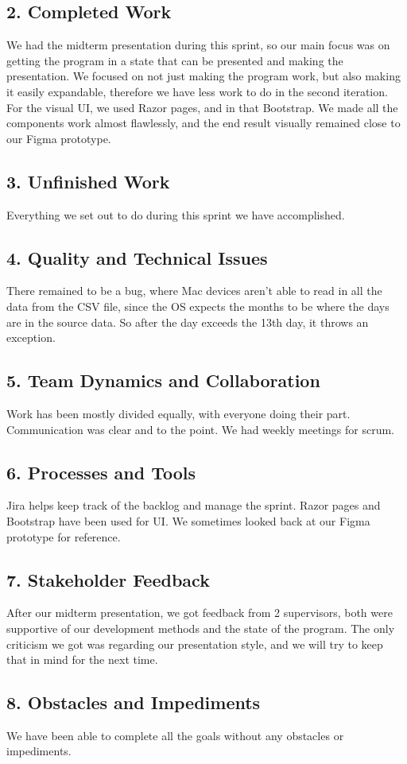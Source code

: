 \documentclass[12pt]{report}
\begin{document}
\subsection*{2. Completed Work}
We had the midterm presentation during this sprint, so our main focus was on getting the program in a state that can be presented and making the presentation. We focused on not just making the program work, but also making it easily expandable, therefore we have less work to do in the second iteration. For the visual UI, we used Razor pages, and in that Bootstrap. We made all the components work almost flawlessly, and the end result visually remained close to our Figma prototype.
\subsection*{3. Unfinished Work}
Everything we set out to do during this sprint we have accomplished.
\subsection*{4. Quality and Technical Issues}
There remained to be a bug, where Mac devices aren't able to read in all the data from the CSV file, since the OS expects the months to be where the days are in the source data. So after the day exceeds the 13th day, it throws an exception.
\subsection*{5. Team Dynamics and Collaboration}
Work has been mostly divided equally, with everyone doing their part. Communication was clear and to the point. We had weekly meetings for scrum.
\subsection*{6. Processes and Tools}
Jira helps keep track of the backlog and manage the sprint. Razor pages and Bootstrap have been used for UI. We sometimes looked back at our Figma prototype for reference.
\subsection*{7. Stakeholder Feedback}
After our midterm presentation, we got feedback from 2 supervisors, both were supportive of our development methods and the state of the program. The only criticism we got was regarding our presentation style, and we will try to keep that in mind for the next time.
\subsection*{8. Obstacles and Impediments}
We have been able to complete all the goals without any obstacles or impediments.
\end{document}
